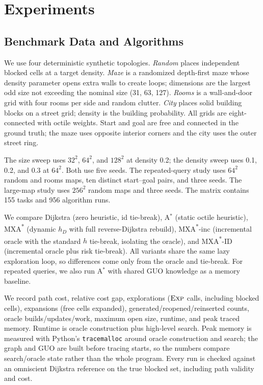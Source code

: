 \documentclass[conference]{IEEEtran}
\newcommand{\hD}{h_{D}}
\newcommand{\Exp}{\textsc{Exp}}
\newcommand{\MXA}{MXA\textsuperscript{*}}
\newcommand{\MXAID}{MXA\textsuperscript{*}-ID}
\newcommand{\MXAinc}{MXA\textsuperscript{*}-inc}
\begin{document}
\section{Experiments}
\label{sec:experiments}
\subsection{Benchmark Data and Algorithms}
We use four deterministic synthetic topologies. \emph{Random} places independent blocked cells at a target density. \emph{Maze} is a randomized depth-first maze whose density parameter opens extra walls to create loops; dimensions are the largest odd size not exceeding the nominal size (31, 63, 127). \emph{Rooms} is a wall-and-door grid with four rooms per side and random clutter. \emph{City} places solid building blocks on a street grid; density is the building probability. All grids are eight-connected with octile weights. Start and goal are free and connected in the ground truth; the maze uses opposite interior corners and the city uses the outer street ring.

The size sweep uses $32^2$, $64^2$, and $128^2$ at density 0.2; the density sweep uses 0.1, 0.2, and 0.3 at $64^2$. Both use five seeds. The repeated-query study uses $64^2$ random and rooms maps, ten distinct start--goal pairs, and three seeds. The large-map study uses $256^2$ random maps and three seeds. The matrix contains 155 tasks and 956 algorithm runs.

We compare Dijkstra (zero heuristic, id tie-break), A$^*$ (static octile heuristic), \MXA{} (dynamic $\hD$ with full reverse-Dijkstra rebuild), \MXAinc{} (incremental oracle with the standard $h$ tie-break, isolating the oracle), and \MXAID{} (incremental oracle plus risk tie-break). All variants share the same lazy exploration loop, so differences come only from the oracle and tie-break. For repeated queries, we also run A$^*$ with shared GUO knowledge as a memory baseline.

We record path cost, relative cost gap, explorations ($\Exp$ calls, including blocked cells), expansions (free cells expanded), generated/reopened/reinserted counts, oracle builds/updates/work, maximum open size, runtime, and peak traced memory. Runtime is oracle construction plus high-level search. Peak memory is measured with Python's \texttt{tracemalloc} around oracle construction and search; the graph and GUO are built before tracing starts, so the numbers compare search/oracle state rather than the whole program. Every run is checked against an omniscient Dijkstra reference on the true blocked set, including path validity and cost.
\end{document}
